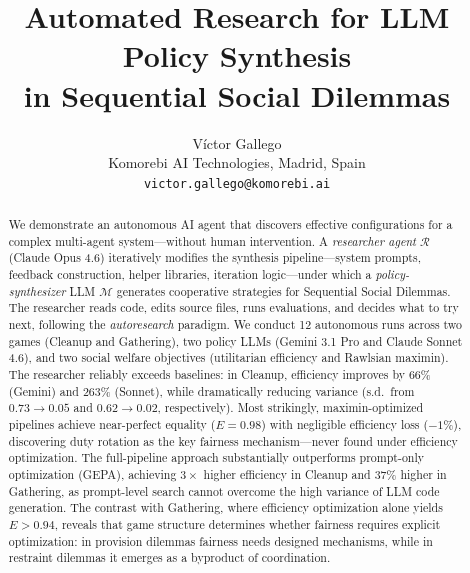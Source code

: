 \documentclass[10pt,twocolumn]{article}
\newcommand{\cR}{\mathcal{R}}
\newcommand{\cM}{\mathcal{M}}
\begin{document}
\title{Automated Research for LLM Policy Synthesis\\in Sequential Social Dilemmas}

\author{V\'ictor Gallego\\
\small Komorebi AI Technologies, Madrid, Spain\\
\small \texttt{victor.gallego@komorebi.ai}}
\date{}

\maketitle

\begin{abstract}
We demonstrate an autonomous AI agent that discovers effective configurations for a complex multi-agent system---without human intervention. A \emph{researcher agent} $\cR$ (Claude Opus 4.6) iteratively modifies the synthesis pipeline---system prompts, feedback construction, helper libraries, iteration logic---under which a \emph{policy-synthesizer} LLM $\cM$ generates cooperative strategies for Sequential Social Dilemmas. The researcher reads code, edits source files, runs evaluations, and decides what to try next, following the \emph{autoresearch} paradigm. We conduct 12 autonomous runs across two games (Cleanup and Gathering), two policy LLMs (Gemini 3.1 Pro and Claude Sonnet 4.6), and two social welfare objectives (utilitarian efficiency and Rawlsian maximin). The researcher reliably exceeds baselines: in Cleanup, efficiency improves by 66\% (Gemini) and 263\% (Sonnet), while dramatically reducing variance (s.d.\ from $0.73 \to 0.05$ and $0.62 \to 0.02$, respectively). Most strikingly, maximin-optimized pipelines achieve near-perfect equality ($E{=}0.98$) with negligible efficiency loss ($-1\%$), discovering duty rotation as the key fairness mechanism---never found under efficiency optimization. The full-pipeline approach substantially outperforms prompt-only optimization (GEPA), achieving $3{\times}$ higher efficiency in Cleanup and $37\%$ higher in Gathering, as prompt-level search cannot overcome the high variance of LLM code generation. The contrast with Gathering, where efficiency optimization alone yields $E{>}0.94$, reveals that game structure determines whether fairness requires explicit optimization: in provision dilemmas fairness needs designed mechanisms, while in restraint dilemmas it emerges as a byproduct of coordination.
\end{abstract}

\end{document}
